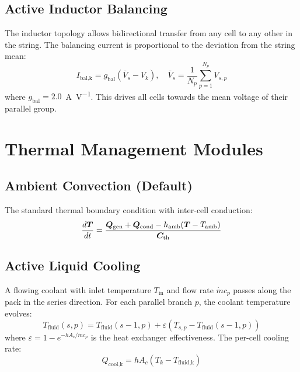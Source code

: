 \subsection{Active Inductor Balancing}

The inductor topology allows bidirectional transfer from any cell to any other in the string. The balancing current is proportional to the deviation from the string mean:
\begin{equation}
  I_\text{bal,k} = g_\text{bal}(\bar{V}_s - V_k), \quad \bar{V}_s = \frac{1}{N_p}\sum_{p=1}^{N_p} V_{s,p}
  \label{eq:active_ind_bal}
\end{equation}
where $g_\text{bal} = 2.0$~\si{\ampere\per\volt}. This drives all cells towards the mean voltage of their parallel group.

\section{Thermal Management Modules}
\label{sec:thermal_mgmt}

\subsection{Ambient Convection (Default)}

The standard thermal boundary condition with inter-cell conduction:
\begin{equation}
  \dfrac{d \boldsymbol{T}}{dt} = \frac{\boldsymbol{Q}_\text{gen} + \boldsymbol{Q}_\text{cond} - h_\text{amb}(\boldsymbol{T} - T_\text{amb})}{\boldsymbol{C}_\text{th}}
  \label{eq:ambient_thermal}
\end{equation}

\subsection{Active Liquid Cooling}

A flowing coolant with inlet temperature $T_\text{in}$ and flow rate $\dot{m}c_p$ passes along the pack in the series direction. For each parallel branch $p$, the coolant temperature evolves:
\begin{equation}
  T_\text{fluid}(s, p) = T_\text{fluid}(s-1, p) + \varepsilon (T_{s,p} - T_\text{fluid}(s-1, p))
  \label{eq:coolant_propagation}
\end{equation}
where $\varepsilon = 1 - e^{-hA_c/\dot{m}c_p}$ is the heat exchanger effectiveness. The per-cell cooling rate:
\begin{equation}
  Q_\text{cool,k} = hA_c (T_k - T_\text{fluid,k})
  \label{eq:liquid_cool}
\end{equation}

